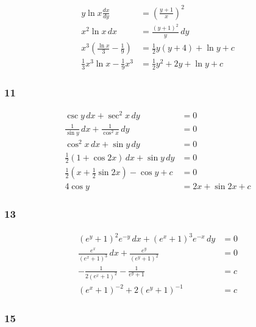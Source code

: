 \documentclass{article}
\begin{document}
\begin{align*}
  y \ln x \frac{d x}{d y}                          & = \left( \frac{y + 1}{x} \right)^2  \\
  x^2 \ln x \,d x                                  & = \frac{(y + 1)^2}{y} \,d y         \\
  x^3 \left( \frac{\ln x}{3} - \frac{1}{9} \right) & = \frac{1}{2} y (y + 4) + \ln y + c \\
  \frac{1}{3} x^3 \ln x - \frac{1}{9} x^3          & = \frac{1}{2} y^2 + 2 y + \ln y + c
\end{align*}

\subsubsection{11}

\begin{align*}
  \csc y \,d x + \sec^2 x \,d y                                    & = 0                  \\
  \frac{1}{\sin y} \,d x + \frac{1}{\cos^2 x} \,d y                & = 0                  \\
  \cos^2 x \,d x + \sin y \,d y                                    & = 0                  \\
  \frac{1}{2} (1 + \cos 2 x) \,d x + \sin y \,d y                  & = 0                  \\
  \frac{1}{2} \left( x + \frac{1}{2} \sin 2 x \right) - \cos y + c & = 0                  \\
  4 \cos y                                                         & = 2 x + \sin 2 x + c
\end{align*}

\subsubsection{13}

\begin{align*}
  (e^y +1)^2 e^{-y} \,d x + (e^x + 1)^3 e^{-x} \,d y      & = 0 \\
  \frac{e^x}{(e^x + 1)^3} \,d x + \frac{e^y}{(e^y + 1)^2} & = 0 \\
  -\frac{1}{2 (e^x + 1)^2} - \frac{1}{e^y + 1}            & = c \\
  (e^x + 1)^{-2} + 2(e^y + 1)^{-1}                        & = c
\end{align*}

\subsubsection{15}
\end{document}
